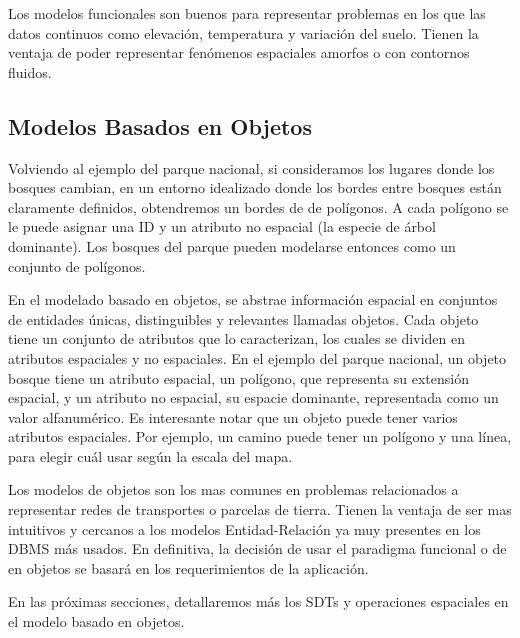 Los modelos funcionales son buenos para representar problemas en los que las datos continuos como elevación, temperatura y variación del suelo. Tienen la ventaja de poder representar fenómenos espaciales amorfos o con contornos fluidos.

\subsection{Modelos Basados en Objetos}

Volviendo al ejemplo del parque nacional, si consideramos los lugares donde los bosques cambian, en un entorno idealizado donde los bordes entre bosques están claramente definidos, obtendremos un bordes de de polígonos. A cada polígono se le puede asignar una ID y un atributo no espacial (la especie de árbol dominante). Los bosques del parque pueden modelarse entonces como un conjunto de polígonos.

En el modelado basado en objetos, se abstrae información espacial en conjuntos de entidades únicas, distinguibles y relevantes llamadas objetos. Cada objeto tiene un conjunto de atributos que lo caracterizan, los cuales se dividen en atributos espaciales y no espaciales. En el ejemplo del parque nacional, un objeto bosque tiene un atributo espacial, un polígono, que representa su extensión espacial, y un atributo no espacial, su espacie dominante, representada como un valor alfanumérico. Es interesante notar que un objeto puede tener varios atributos espaciales. Por ejemplo, un camino puede tener un polígono y una línea, para elegir cuál usar según la escala del mapa.

Los modelos de objetos son los mas comunes en problemas relacionados a representar redes de transportes o parcelas de tierra. Tienen la ventaja de ser mas intuitivos y cercanos a los modelos Entidad-Relación ya muy presentes en los DBMS más usados. En definitiva, la decisión de usar el paradigma funcional o de en objetos se basará en los requerimientos de la aplicación.

En las próximas secciones, detallaremos más los SDTs y operaciones espaciales en el modelo basado en objetos.

